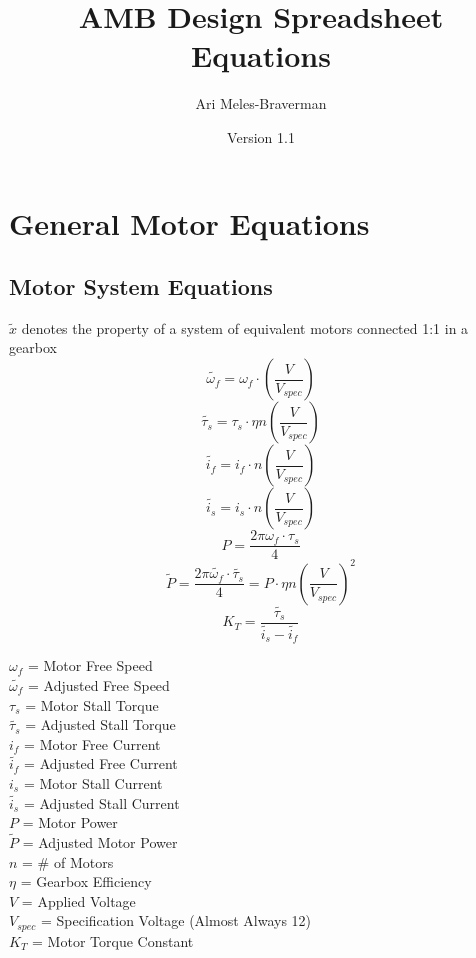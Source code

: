 \documentclass[11pt,a4paper,titlepage]{article}
\begin{document}
	\title{AMB Design Spreadsheet Equations}
	\author{Ari Meles-Braverman}
	\date{Version 1.1}
	\maketitle
	
	\section{General Motor Equations}
	\subsection{Motor System Equations}
	$\tilde{x}$ denotes the property of a system of equivalent motors connected 1:1 in a gearbox
	\begin{equation}
		\tilde{\omega_f} = \omega_f \cdot \left( \frac{V}{V_{spec}} \right)
	\end{equation}
	\begin{equation}
		\tilde{\tau_s} = \tau_s \cdot \eta n \left( \frac{V}{V_{spec}} \right)
	\end{equation}
	\begin{equation}
		\tilde{i_f} = i_f \cdot n \left( \frac{V}{V_{spec}} \right)
	\end{equation}
	\begin{equation}
		\tilde{i_s} = i_s \cdot n \left( \frac{V}{V_{spec}} \right)
	\end{equation}
	\begin{equation}
		P = \frac{2\pi \omega_f \cdot \tau_s}{4}
	\end{equation}
	\begin{equation}
		\tilde{P} = \frac{2\pi \tilde{\omega_f} \cdot \tilde{\tau_s}}{4} = P \cdot \eta n \left( \frac{V}{V_{spec}} \right) ^2
	\end{equation}
	\begin{equation}
		K_T = \frac{\tilde{\tau_s}}{\tilde{i_s} - \tilde{i_f}}
	\end{equation}
	
	$\omega_f$ = Motor Free Speed \\
	$\tilde{\omega_f}$ = Adjusted Free Speed \\
	$\tau_s$ = Motor Stall Torque \\
	$\tilde{\tau_s}$ = Adjusted Stall Torque \\
	$i_f$ = Motor Free Current \\
	$\tilde{i_f}$ = Adjusted Free Current \\
	$i_s$ = Motor Stall Current \\
	$\tilde{i_s}$ = Adjusted Stall Current \\
	$P$ = Motor Power \\
	$\tilde{P}$ = Adjusted Motor Power \\
	$n$ = \# of Motors \\
	$\eta$ = Gearbox Efficiency \\
	$V$ = Applied Voltage \\
	$V_{spec}$ = Specification Voltage (Almost Always 12) \\
	$K_T$ = Motor Torque Constant
	
\end{document}
